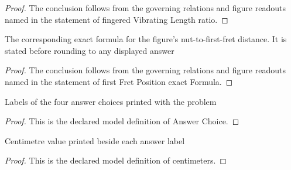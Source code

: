 \begin{proof}
  The conclusion follows from the governing relations and figure readouts named in the statement of fingered Vibrating Length ratio.
\end{proof}
\begin{lemma}
  \label{lem:physics:phyx-mini-0218:phyxminiproblems-problemphyxmini0218-firstfretposition-exactformula}
  The corresponding exact formula for the figure's nut-to-first-fret distance. It is stated before rounding to any displayed answer
\end{lemma}
\begin{proof}
  The conclusion follows from the governing relations and figure readouts named in the statement of first Fret Position exact Formula.
\end{proof}
\begin{definition}
  \label{def:physics:phyx-mini-0218:phyxminiproblems-problemphyxmini0218-answerchoice}
  Labels of the four answer choices printed with the problem
\end{definition}
\begin{proof}
  This is the declared model definition of Answer Choice.
\end{proof}
\begin{definition}[centimeters]
  \label{def:physics:phyx-mini-0218:phyxminiproblems-problemphyxmini0218-answerchoice-centimeters}
  Centimetre value printed beside each answer label
\end{definition}
\begin{proof}
  This is the declared model definition of centimeters.
\end{proof}
